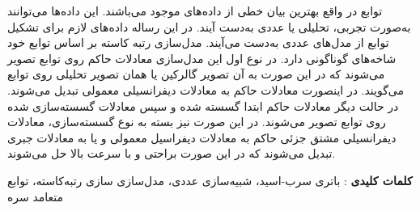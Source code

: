  توابع  در واقع بهترین بیان خطی از داده‌های موجود می‌باشند. این داده‌ها می‌توانند به‌صورت تجربی، تحلیلی یا عددی به‌دست آیند. در این رساله داده‌های لازم برای تشکیل توابع  از مدل‌های عددی به‌دست می‌آیند.
 مدل‌سازی رتبه کاسته بر اساس توابع  خود شاخه‌های گوناگونی دارد.
  در نوع اول این مدل‌سازی معادلات حاکم روی توابع  تصویر می‌شوند که در این صورت به آن تصویر گالرکین یا همان تصویر تحلیلی روی توابع می‌گویند. در اینصورت معادلات حاکم به معادلات دیفرانسیلی معمولی تبدیل می‌شوند. در حالت دیگر معادلات حاکم ابتدا گسسته شده و سپس معادلات گسسته‌سازی شده روی توابع  تصویر می‌شوند. در این صورت نیز بسته به نوع گسسته‌سازی، معادلات دیفرانسیلی مشتق جزئی حاکم به معادلات دیفراسیل معمولی و یا به معادلات جبری تبدیل می‌شوند که در این صورت براحتی و با سرعت بالا حل می‌شوند.

\thispagestyle{empty} 
\hspace{-0.65cm}%
\textbf{\textcolor{BrickRed}{کلمات کلیدی}} :
باتری سرب-اسید، شبیه‌سازی عددی، مدل‌سازی سازی رتبه‌کاسته، توابع متعامد سره

%
\clearpage
